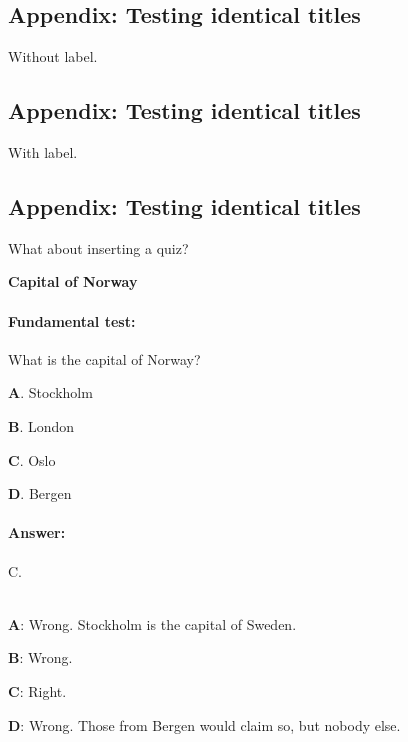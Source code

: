 \documentclass[%
oneside,                 %
final,                   %
10pt]{article}
\newenvironment{doconcequiz}{}{}
\newcounter{doconcequizcounter}
\theoremstyle{definition}
\begin{document}
\begin{enumerate}
\subsection{Appendix: Testing identical titles}
Without label.
\subsection{Appendix: Testing identical titles}
\label{test:title:id1}
With label.
\subsection{Appendix: Testing identical titles}
\label{test:title:id2}
What about inserting a quiz?

\begin{doconcequiz}
\label{quiz:2}


\noindent\textbf{\large Capital of Norway}
\paragraph{Fundamental test:}
What is the capital of Norway?

\vspace{2mm}

\textbf{A}. 
Stockholm

\textbf{B}. 
London

\textbf{C}. 
Oslo

\textbf{D}. 
Bergen


\paragraph{Answer:} C.

\\


\textbf{A}: Wrong. Stockholm is the capital of Sweden.

\textbf{B}: Wrong. 

\textbf{C}: Right. 

\textbf{D}: Wrong. Those from Bergen would claim so, but nobody else.




\vspace{3mm}

\end{doconcequiz}



\end{enumerate}
\end{document}
